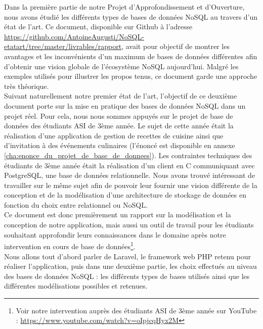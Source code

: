 Dans la première partie de notre Projet d'Approfondissement et d'Ouverture, nous avons étudié les différents types de bases de données NoSQL au travers d'un état de l'art. Ce document, disponible sur Github à l'adresse \url{https://github.com/AntoineAugusti/NoSQL-etatart/tree/master/livrables/rapport}, avait pour objectif de montrer les avantages et les inconvénients d'un maximum de bases de données différentes afin d'obtenir une vision globale de l'écosystème NoSQL aujourd'hui. Malgré les exemples utilisés pour illustrer les propos tenus, ce document garde une approche très théorique.\\

Suivant naturellement notre premier état de l'art, l'objectif de ce deuxième document porte sur la mise en pratique des bases de données NoSQL dans un projet réel. Pour cela, nous nous sommes appuyés sur le projet de base de données des étudiants ASI de 3ème année. Le sujet de cette année était la réalisation d'une application de gestion de recettes de cuisine ainsi que d'invitation à des événements culinaires (l'énoncé est disponible en annexe \ref{cha:enonce_du_projet_de_base_de_donnees}). Les contraintes techniques des étudiants de 3ème année était la réalisation d'un client en C communiquant avec PostgreSQL, une base de données relationnelle. Nous avons trouvé intéressant de travailler sur le même sujet afin de pouvoir leur fournir une vision différente de la conception et de la modélisation d'une architecture de stockage de données en fonction du choix entre relationnel ou NoSQL.\\

Ce document est donc premièrement un rapport sur la modélisation et la conception de notre application, mais aussi un outil de travail pour les étudiants souhaitant approfondir leurs connaissances dans le domaine après notre intervention en cours de base de données\footnote{Voir notre intervention auprès des étudiants ASI de 3ème année sur YouTube : \url{https://www.youtube.com/watch?v=oIpjcqHyx2M}}.\\

Nous allons tout d'abord parler de Laravel, le framework web PHP retenu pour réaliser l'application, puis dans une deuxième partie, les choix effectués au niveau des bases de données NoSQL : les différents types de bases utilisés ainsi que les différentes modélisations possibles et retenues.